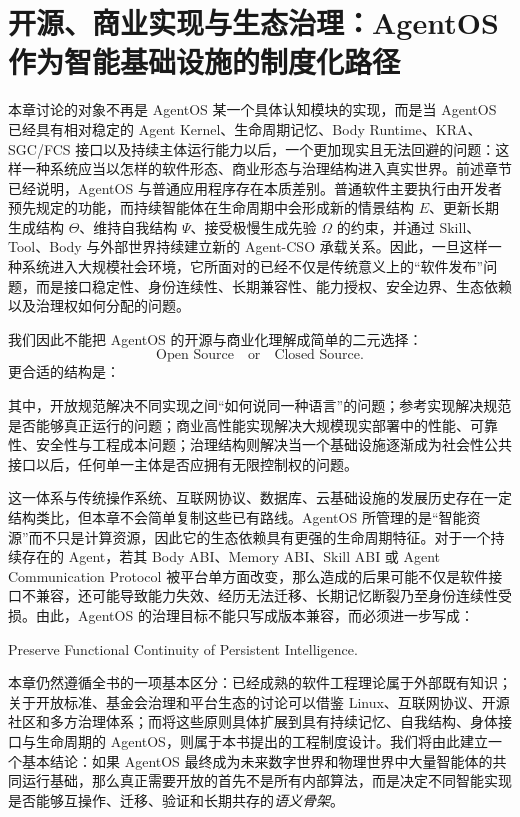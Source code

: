 \chapter{开源、商业实现与生态治理：AgentOS 作为智能基础设施的制度化路径}

\begin{chapterlead}
本章讨论的对象不再是 AgentOS 某一个具体认知模块的实现，而是当 AgentOS 已经具有相对稳定的 Agent Kernel、生命周期记忆、Body Runtime、KRA、SGC/FCS 接口以及持续主体运行能力以后，一个更加现实且无法回避的问题：这样一种系统应当以怎样的软件形态、商业形态与治理结构进入真实世界。前述章节已经说明，AgentOS 与普通应用程序存在本质差别。普通软件主要执行由开发者预先规定的功能，而持续智能体在生命周期中会形成新的情景结构 $E$、更新长期生成结构 $\Theta$、维持自我结构 $\Psi$、接受极慢生成先验 $\Omega$ 的约束，并通过 Skill、Tool、Body 与外部世界持续建立新的 Agent-CSO 承载关系。因此，一旦这样一种系统进入大规模社会环境，它所面对的已经不仅是传统意义上的``软件发布''问题，而是接口稳定性、身份连续性、长期兼容性、能力授权、安全边界、生态依赖以及治理权如何分配的问题。

我们因此不能把 AgentOS 的开源与商业化理解成简单的二元选择：
\[
\text{Open Source}
\quad \text{or} \quad
\text{Closed Source}.
\]
更合适的结构是：
\begin{statementbox}
\centering
{}
\end{statementbox}
其中，开放规范解决不同实现之间``如何说同一种语言''的问题；参考实现解决规范是否能够真正运行的问题；商业高性能实现解决大规模现实部署中的性能、可靠性、安全性与工程成本问题；治理结构则解决当一个基础设施逐渐成为社会性公共接口以后，任何单一主体是否应拥有无限控制权的问题。

这一体系与传统操作系统、互联网协议、数据库、云基础设施的发展历史存在一定结构类比，但本章不会简单复制这些已有路线。AgentOS 所管理的是``智能资源''而不只是计算资源，因此它的生态依赖具有更强的生命周期特征。对于一个持续存在的 Agent，若其 Body ABI、Memory ABI、Skill ABI 或 Agent Communication Protocol 被平台单方面改变，那么造成的后果可能不仅是软件接口不兼容，还可能导致能力失效、经历无法迁移、长期记忆断裂乃至身份连续性受损。由此，AgentOS 的治理目标不能只写成版本兼容，而必须进一步写成：
\begin{statementbox}
Preserve Functional Continuity of Persistent Intelligence.
\end{statementbox}

本章仍然遵循全书的一项基本区分：已经成熟的软件工程理论属于外部既有知识；关于开放标准、基金会治理和平台生态的讨论可以借鉴 Linux、互联网协议、开源社区和多方治理体系；而将这些原则具体扩展到具有持续记忆、自我结构、身体接口与生命周期的 AgentOS，则属于本书提出的工程制度设计。我们将由此建立一个基本结论：如果 AgentOS 最终成为未来数字世界和物理世界中大量智能体的共同运行基础，那么真正需要开放的首先不是所有内部算法，而是决定不同智能实现是否能够互操作、迁移、验证和长期共存的\emph{语义骨架}。
\end{chapterlead}

